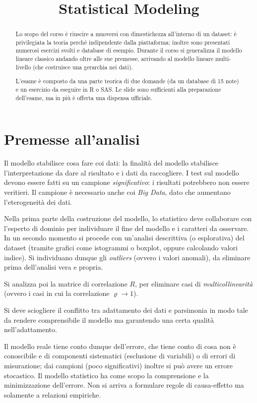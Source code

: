 \documentclass[11pt, twocolumn]{article}
\title{\textbf{Statistical Modeling}}
\author{}
\date{}
\begin{document}
\maketitle
\begin{abstract}
  Lo scopo del corso è riuscire a muoversi con dimestichezza all'interno di un dataset: è privilegiata la teoria perché indipendente dalla piattaforma; inoltre sono presentati numerosi esercizi svolti e database di esempio.
  Durante il corso si generalizza il modello lineare classico andando oltre alle sue premesse, arrivando al modello lineare multi-livello (che costruisce una gerarchia nei dati).

  L'esame è composto da una parte teorica di due domande (da un database di 15 note) e un esercizio da eseguire in R o SAS.
  Le slide sono sufficienti alla preparazione dell'esame, ma in più è offerta una dispensa ufficiale.
\end{abstract}

\newpage
\part{Premesse all'analisi}
Il modello stabilisce cosa fare coi dati: la finalità del modello stabilisce l'interpretazione da dare al risultato e i dati da raccogliere.
I test sul modello devono essere fatti su un campione \textit{significativo}: i risultati potrebbero non essere veritieri.
Il campione è necessario anche coi \textit{Big Data}, dato che aumentano l'eterogeneità dei dati.

Nella prima parte della costruzione del modello, lo statistico deve collaborare con l'esperto di dominio per individuare il fine del modello e i caratteri da osservare.
In un secondo momento si procede con un'analisi descrittiva (o esplorativa) del dataset (tramite grafici come istogrammi o boxplot, oppure calcolando valori indice).
Si individuano dunque gli \textit{outliers} (ovvero i valori anomali), da eliminare prima dell'analisi vera e propria.

Si analizza poi la matrice di correlazione $R$, per eliminare casi di \textit{multicollinearità} (ovvero i casi in cui la correlazione $\varrho \to 1$).

Si deve sciogliere il conflitto tra adattamento dei dati e parsimonia in modo tale da rendere comprensibile il modello ma garantendo una certa qualità nell'adattamento.

Il modello reale tiene conto dunque dell'errore, che tiene conto di cosa non è conoscibile e di componenti sistematici (esclusione di variabili) o di errori di misurazione; dai campioni (poco significativi) inoltre si può avere un errore stocastico.
Il modello statistico ha come scopo la comprensione e la minimizzazione dell'errore.
Non si arriva a formulare regole di causa-effetto ma solamente a relazioni empiriche.
\end{document}
